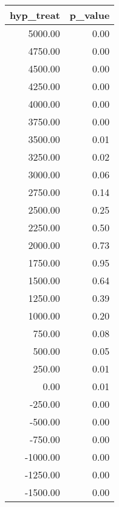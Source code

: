 \begin{tabular}{rr}
  \hline
hyp\_treat & p\_value \\ 
  \hline
5000.00 & 0.00 \\ 
  4750.00 & 0.00 \\ 
  4500.00 & 0.00 \\ 
  4250.00 & 0.00 \\ 
  4000.00 & 0.00 \\ 
  3750.00 & 0.00 \\ 
  3500.00 & 0.01 \\ 
  3250.00 & 0.02 \\ 
  3000.00 & 0.06 \\ 
  2750.00 & 0.14 \\ 
  2500.00 & 0.25 \\ 
  2250.00 & 0.50 \\ 
  2000.00 & 0.73 \\ 
  1750.00 & 0.95 \\ 
  1500.00 & 0.64 \\ 
  1250.00 & 0.39 \\ 
  1000.00 & 0.20 \\ 
  750.00 & 0.08 \\ 
  500.00 & 0.05 \\ 
  250.00 & 0.01 \\ 
  0.00 & 0.01 \\ 
  -250.00 & 0.00 \\ 
  -500.00 & 0.00 \\ 
  -750.00 & 0.00 \\ 
  -1000.00 & 0.00 \\ 
  -1250.00 & 0.00 \\ 
  -1500.00 & 0.00 \\ 
   \hline
\end{tabular}
